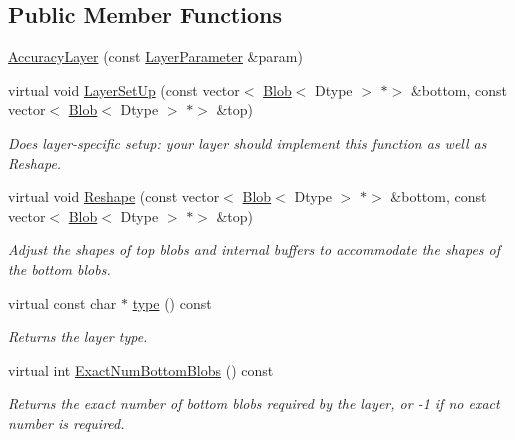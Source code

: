 \subsection*{Public Member Functions}
\begin{DoxyCompactItemize}
\item 
\mbox{\hyperlink{classcaffe_1_1_accuracy_layer_a362ab61d1961c1b408f84a956f6e598d}{Accuracy\+Layer}} (const \mbox{\hyperlink{classcaffe_1_1_layer_parameter}{Layer\+Parameter}} \&param)
\item 
virtual void \mbox{\hyperlink{classcaffe_1_1_accuracy_layer_a1f2447583c670d92ff6e2c8d53fb4dd9}{Layer\+Set\+Up}} (const vector$<$ \mbox{\hyperlink{classcaffe_1_1_blob}{Blob}}$<$ Dtype $>$ $\ast$$>$ \&bottom, const vector$<$ \mbox{\hyperlink{classcaffe_1_1_blob}{Blob}}$<$ Dtype $>$ $\ast$$>$ \&top)
\begin{DoxyCompactList}\small\item\em Does layer-\/specific setup\+: your layer should implement this function as well as Reshape. \end{DoxyCompactList}\item 
virtual void \mbox{\hyperlink{classcaffe_1_1_accuracy_layer_aa2b680fc1e754440c2babd150e09f2f6}{Reshape}} (const vector$<$ \mbox{\hyperlink{classcaffe_1_1_blob}{Blob}}$<$ Dtype $>$ $\ast$$>$ \&bottom, const vector$<$ \mbox{\hyperlink{classcaffe_1_1_blob}{Blob}}$<$ Dtype $>$ $\ast$$>$ \&top)
\begin{DoxyCompactList}\small\item\em Adjust the shapes of top blobs and internal buffers to accommodate the shapes of the bottom blobs. \end{DoxyCompactList}\item 
\mbox{\label{classcaffe_1_1_accuracy_layer_a6039b0528a2017c4f9d32ad2c67a9ef2}} 
virtual const char $\ast$ \mbox{\hyperlink{classcaffe_1_1_accuracy_layer_a6039b0528a2017c4f9d32ad2c67a9ef2}{type}} () const
\begin{DoxyCompactList}\small\item\em Returns the layer type. \end{DoxyCompactList}\item 
virtual int \mbox{\hyperlink{classcaffe_1_1_accuracy_layer_afb0d3db8e4a18bec0e05d54d11453ef1}{Exact\+Num\+Bottom\+Blobs}} () const
\begin{DoxyCompactList}\small\item\em Returns the exact number of bottom blobs required by the layer, or -\/1 if no exact number is required. \end{DoxyCompactList}\item 

\end{DoxyCompactItemize}
